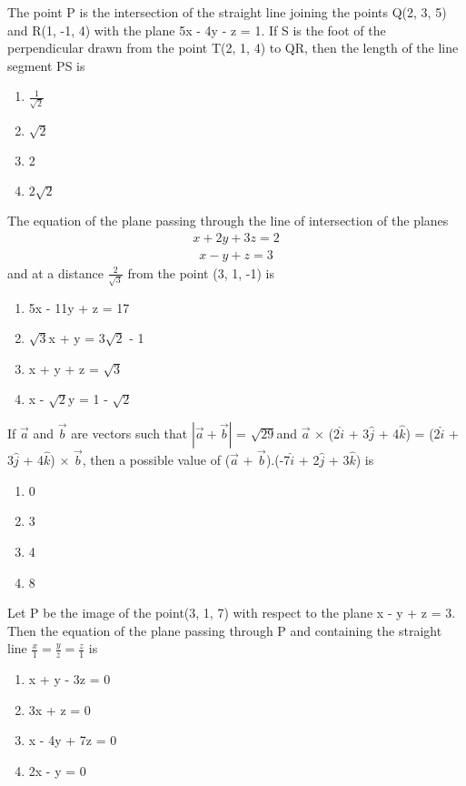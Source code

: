 \item The point P is the intersection of the straight line joining the points Q(2, 3, 5) and R(1, -1, 4) with the plane 5x - 4y - z = 1. If S is the foot of the perpendicular drawn from the point T(2, 1, 4) to QR, then 
the length of the line segment PS is
\begin{enumerate}
\item $\frac{1}{\sqrt{2}}$
\item $\sqrt{2}$
\item 2
\item $2\sqrt{2}$
\end{enumerate}

\item The equation of the plane passing through the line of intersection of the planes
\begin{align*}
x + 2y + 3z = 2
\end{align*}
\begin{align*}
x - y + z = 3
\end{align*}
and at a distance $\frac{2}{\sqrt{3}}$ from the point (3, 1, -1) is
\begin{enumerate}
\item 5x - 11y + z = 17
\item $\sqrt{3}$x + y = 3$\sqrt{2}$ - 1
\item x + y + z = $\sqrt{3}$
\item x - $\sqrt{2}$y = 1 - $\sqrt{2}$
\end{enumerate}

\item If $\overrightarrow{a}$ and $\overrightarrow{b}$ are vectors such that $|\overrightarrow{a} + \overrightarrow{b}|$ = $\sqrt{29}$and $\overrightarrow{a}$ $\times$ (2$\hat{i}$ + 3$\hat{j}$ + 4$\hat{k}$) = (2$\hat{i}$ + 3$\hat{j}$ + 4$\hat{k}$) $\times$ $\overrightarrow{b}$, then a possible value of ($\overrightarrow{a}$ + $\overrightarrow{b}$).(-7$\hat{i}$ + 2$\hat{j}$ + 3$\hat{k}$) is 
\begin{enumerate}
\item 0
\item 3
\item 4
\item 8
\end{enumerate}

\item Let P be the image of the point(3, 1, 7) with respect to the plane x - y + z = 3. Then the equation of the plane passing through P and containing the straight line $\frac{x}{1} = \frac{y}{z} = \frac{z}{1}$ is
\begin{enumerate}
\item x + y - 3z = 0
\item 3x + z = 0
\item x - 4y + 7z = 0
\item 2x - y = 0
\end{enumerate}

